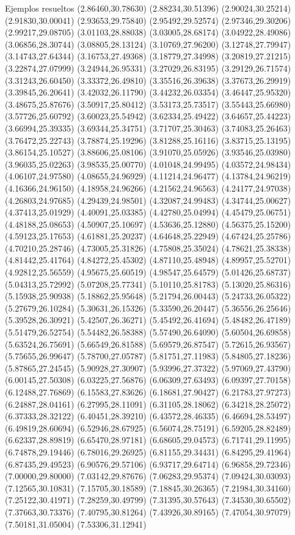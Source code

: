 \documentclass[11pt,a4paper]{article}
\begin{document}
\begin{fmex}{Ejemplos resueltos}
(2.86460,30.78630) (2.88234,30.51396) (2.90024,30.25214) (2.91830,30.00041) (2.93653,29.75840) (2.95492,29.52574) (2.97346,29.30206) (2.99217,29.08705) (3.01103,28.88038) (3.03005,28.68174) (3.04922,28.49086) (3.06856,28.30744) (3.08805,28.13124) (3.10769,27.96200) (3.12748,27.79947) (3.14743,27.64344) (3.16753,27.49368) (3.18779,27.34998) (3.20819,27.21215) (3.22874,27.07999) (3.24944,26.95331) (3.27029,26.83195) (3.29129,26.71574) (3.31243,26.60450) (3.33372,26.49810) (3.35516,26.39638) (3.37673,26.29919) (3.39845,26.20641) (3.42032,26.11790) (3.44232,26.03354) (3.46447,25.95320) (3.48675,25.87676) (3.50917,25.80412) (3.53173,25.73517) (3.55443,25.66980) (3.57726,25.60792) (3.60023,25.54942) (3.62334,25.49422) (3.64657,25.44223) (3.66994,25.39335) (3.69344,25.34751) (3.71707,25.30463) (3.74083,25.26463) (3.76472,25.22743) (3.78874,25.19296) (3.81288,25.16116) (3.83715,25.13195) (3.86154,25.10527) (3.88606,25.08106) (3.91070,25.05926) (3.93546,25.03980) (3.96035,25.02263) (3.98535,25.00770) (4.01048,24.99495) (4.03572,24.98434) (4.06107,24.97580) (4.08655,24.96929) (4.11214,24.96477) (4.13784,24.96219) (4.16366,24.96150) (4.18958,24.96266) (4.21562,24.96563) (4.24177,24.97038) (4.26803,24.97685) (4.29439,24.98501) (4.32087,24.99483) (4.34744,25.00627) (4.37413,25.01929) (4.40091,25.03385) (4.42780,25.04994) (4.45479,25.06751) (4.48188,25.08653) (4.50907,25.10697) (4.53636,25.12880) (4.56375,25.15200) (4.59123,25.17653) (4.61881,25.20237) (4.64648,25.22949) (4.67424,25.25786) (4.70210,25.28746) (4.73005,25.31826) (4.75808,25.35024) (4.78621,25.38338) (4.81442,25.41764) (4.84272,25.45302) (4.87110,25.48948) (4.89957,25.52701) (4.92812,25.56559) (4.95675,25.60519) (4.98547,25.64579) (5.01426,25.68737) (5.04313,25.72992) (5.07208,25.77341) (5.10110,25.81783) (5.13020,25.86316) (5.15938,25.90938) (5.18862,25.95648) (5.21794,26.00443) (5.24733,26.05322) (5.27679,26.10284) (5.30631,26.15326) (5.33590,26.20447) (5.36556,26.25646) (5.39528,26.30921) (5.42507,26.36271) (5.45492,26.41694) (5.48482,26.47189) (5.51479,26.52754) (5.54482,26.58388) (5.57490,26.64090) (5.60504,26.69858) (5.63524,26.75691) (5.66549,26.81588) (5.69579,26.87547) (5.72615,26.93567) (5.75655,26.99647) (5.78700,27.05787) (5.81751,27.11983) (5.84805,27.18236) (5.87865,27.24545) (5.90928,27.30907) (5.93996,27.37322) (5.97069,27.43790) (6.00145,27.50308) (6.03225,27.56876) (6.06309,27.63493) (6.09397,27.70158) (6.12488,27.76869) (6.15583,27.83626) (6.18681,27.90427) (6.21783,27.97273) (6.24887,28.04161) (6.27995,28.11091) (6.31105,28.18062) (6.34218,28.25072) (6.37333,28.32122) (6.40451,28.39210) (6.43572,28.46335) (6.46694,28.53497) (6.49819,28.60694) (6.52946,28.67925) (6.56074,28.75191) (6.59205,28.82489) (6.62337,28.89819) (6.65470,28.97181) (6.68605,29.04573) (6.71741,29.11995) (6.74878,29.19446) (6.78016,29.26925) (6.81155,29.34431) (6.84295,29.41964) (6.87435,29.49523) (6.90576,29.57106) (6.93717,29.64714) (6.96858,29.72346) (7.00000,29.80000) (7.03142,29.87676) (7.06283,29.95374) (7.09424,30.03093) (7.12565,30.10831) (7.15705,30.18589) (7.18845,30.26365) (7.21984,30.34160) (7.25122,30.41971) (7.28259,30.49799) (7.31395,30.57643) (7.34530,30.65502) (7.37663,30.73376) (7.40795,30.81264) (7.43926,30.89165) (7.47054,30.97079) (7.50181,31.05004) (7.53306,31.12941) 
\end{fmex}
\end{document}
